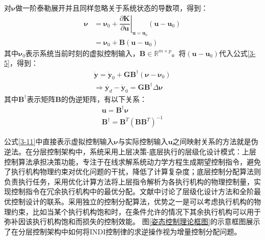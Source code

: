 对$\boldsymbol{\nu}$做一阶泰勒展开并且同样忽略关于系统状态的导数项，得到：
\begin{equation}
    \begin{aligned}
    \boldsymbol{\nu} &= \boldsymbol{\nu}_0 +  \left.\dfrac{\partial \boldsymbol{K}}{\partial \boldsymbol{u}}\right|_{\boldsymbol{u}=\boldsymbol{u}_0}(\boldsymbol{u}-\boldsymbol{u}_0)\\
        &= \boldsymbol{\nu}_0 + \boldsymbol{B}(\boldsymbol{u}-\boldsymbol{u}_0)
    \end{aligned}
    \label{3-9}
\end{equation}
其中$\boldsymbol{\nu}_0$表示系统当前时刻的虚拟控制输入，$\boldsymbol{B}\in\mathbb{R}^{m\times p}$。将$(\boldsymbol{u}-\boldsymbol{u}_0)$代入公式\eqref{3-5}，得到：
\begin{equation}
    \begin{aligned}
    \dot{\boldsymbol{y}}=\dot{\boldsymbol{y}}_0+\boldsymbol{G}\boldsymbol{B}^\dagger(\boldsymbol{\nu}-\boldsymbol{\nu}_0)\\
    \Rightarrow \dot{\boldsymbol{y}_d}-\dot{\boldsymbol{y}}_0 = \boldsymbol{G}\boldsymbol{B}^\dagger\Delta\boldsymbol{\nu}
    \label{3-10}
    \end{aligned}
\end{equation}
其中$\boldsymbol{B}^\dagger$表示矩阵$\boldsymbol{B}$的伪逆矩阵，有以下关系：
\begin{gather}
    \boldsymbol{u}=\boldsymbol{B}^\dagger\boldsymbol{\nu}    \label{3-11}
    \\ 
    \boldsymbol{B}^\dagger=\boldsymbol{B}^T\left(\boldsymbol{B}\boldsymbol{B}^T\right)^{-1}    \label{3-12}
\end{gather}

公式\eqref{3-11}中直接表示虚拟控制输入$\boldsymbol{\nu}$与实际控制输入$\boldsymbol{u}$之间映射关系的方法就是伪逆法。在分层控制架构中，系统采用上层决策-底层执行的层级化设计模式：上层控制算法承担决策功能，专注于在线求解系统动力学方程生成期望控制指令，避免了执行机构物理约束对优化问题的干扰，降低了计算复杂度；底层控制分配算法则负责执行任务，采用优化计算方法将上层指令解析为各执行机构的物理控制量，实现控制指令在冗余执行机构中的最优分配。文献\parencite{harkegardResolvingActuatorRedundancy2005}中讨论了层级化设计方法和全阶最优控制设计的联系。采用独立的控制分配算法，优势之一是可以考虑执行机构的物理约束，比如当某个执行机构饱和时，在条件允许的情况下其余执行机构可以用于弥补因该执行机构饱和而损失的控制效能。
图\ref{姿态控制理论框图}的示意框图展示了在分层控制架构中如何将INDI控制律的求逆操作视为增量控制分配问题\cite{pfeifle2021energy}。

